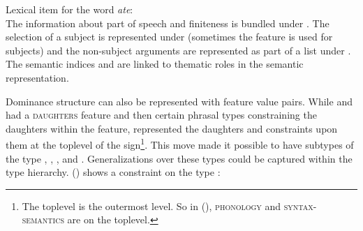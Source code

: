 \documentclass[output=paper]{langsci/langscibook}
\begin{document}
\eas
\label{le-ate}
Lexical item for the word \emph{ate}:\\
\zs
The information about part of speech and finiteness is bundled under \head. The selection of a
subject is represented under \spr (sometimes the feature \subj is used for subjects) and the
non-subject arguments are represented as part of a list under \comps. The semantic indices 
and  are linked to thematic roles in the semantic representation.

Dominance structure can also be represented with feature value pairs. While \citet{ps} and
\citet{ps2} had a \textsc{daughters} feature and then certain phrasal types constraining the
daughters within the \dtrs feature, \citet{Sag97a} represented the daughters and constraints upon them at
the toplevel of the sign\footnote{
The toplevel is the outermost level. So in (), \textsc{phonology} and
\textsc{syntax-semantics} are on the toplevel.}. 
This move made it possible to have subtypes of the type , \eg
{}, , and
. Generalizations over these types could be captured within the type
hierarchy. () shows a constraint on the type :
\end{document}
